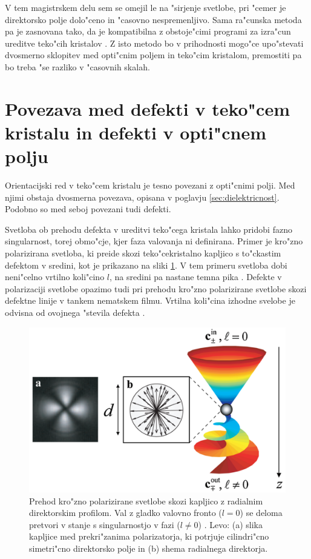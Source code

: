 \documentclass[12pt,twoside,openright,final,a4paper]{report}
\begin{document}
V tem magistrskem delu sem se omejil le na "sirjenje svetlobe, pri "cemer je direktorsko polje dolo"ceno in "casovno nespremenljivo. 
Sama ra"cunska metoda pa je zasnovana tako, da je kompatibilna z obstoje"cimi programi za izra"cun ureditve teko"cih kristalov \cite{ravnik-zumer-ldg}. 
Z isto metodo bo v prihodnosti mogo"ce upo"stevati dvosmerno sklopitev med opti"cnim poljem in teko"cim kristalom, premostiti pa bo treba "se razliko v "casovnih skalah. 

\section{Povezava med defekti v teko"cem kristalu in defekti v opti"cnem polju}
Orientacijski red v teko"cem kristalu je tesno povezani z opti"cnimi polji. 
Med njimi obstaja dvosmerna povezava, opisana v poglavju \ref{sec:dielektricnost}. 
Podobno so med seboj povezani tudi defekti. 

Svetloba ob prehodu defekta v ureditvi teko"cega kristala lahko pridobi fazno singularnost, torej obmo"cje, kjer faza valovanja ni definirana. 
Primer je kro"zno polarizirana svetloba, ki preide skozi teko"cekristalno kapljico s to"ckastim defektom v sredini, kot je prikazano na sliki \ref{fig:defekt-kapljica}. 
V tem primeru svetloba dobi neni"celno vrtilno koli"cino $l$, na sredini pa nastane temna pika \cite{brasselet-droplet}. 
Defekte v polarizaciji svetlobe opazimo tudi pri prehodu kro"zno polarizirane svetlobe skozi defektne linije v tankem nematskem filmu. 
Vrtilna koli"cina izhodne svelobe je odvisna od ovojnega "stevila defekta \cite{brasselet-film}. 

\begin{figure}[!htbp]
 \centering
 \includegraphics[width=.8\textwidth]{defekt-kapljica}
 \caption{Prehod kro"zno polarizirane svetlobe skozi kapljico z radialnim direktorskim profilom. Val z gladko valovno fronto ($l=0$) se deloma pretvori v stanje s singularnostjo v fazi ($l\neq 0$) \cite{brasselet-droplet}. Levo: (a) slika kapljice med prekri"zanima polarizatorja, ki potrjuje cilindri"cno simetri"cno direktorsko polje in (b) shema radialnega direktorja. }
 \label{fig:defekt-kapljica}
\end{figure}
\end{document}
